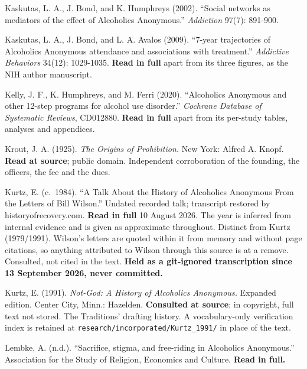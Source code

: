 \documentclass[11pt,a4paper]{article}
\begin{document}
\begin{list}{}{\setlength{\leftmargin}{1.5em}\setlength{\itemindent}{-1.5em}\setlength{\itemsep}{2pt}}
\item Kaskutas, L. A., J. Bond, and K. Humphreys (2002). ``Social networks as mediators of the effect of Alcoholics Anonymous.'' \textit{Addiction} 97(7): 891-900.

\item Kaskutas, L. A., J. Bond, and L. A. Avalos (2009). ``7-year trajectories of Alcoholics Anonymous attendance and associations with treatment.'' \textit{Addictive Behaviors} 34(12): 1029-1035. \textbf{Read in full} apart from its three figures, as the NIH author manuscript.

\item Kelly, J. F., K. Humphreys, and M. Ferri (2020). ``Alcoholics Anonymous and other 12-step programs for alcohol use disorder.'' \textit{Cochrane Database of Systematic Reviews}, CD012880. \textbf{Read in full} apart from its per-study tables, analyses and appendices.

\item Krout, J. A. (1925). \textit{The Origins of Prohibition.} New York: Alfred A. Knopf. \textbf{Read at source}; public domain. Independent corroboration of the founding, the officers, the fee and the dues.

\item Kurtz, E. (c.\ 1984). ``A Talk About the History of Alcoholics Anonymous From the Letters of Bill Wilson.'' Undated recorded talk; transcript restored by historyofrecovery.com. \textbf{Read in full} 10 August 2026. The year is inferred from internal evidence and is given as approximate throughout. Distinct from Kurtz (1979/1991). Wilson's letters are quoted within it from memory and without page citations, so anything attributed to Wilson through this source is at a remove. Consulted, not cited in the text. \textbf{Held as a git-ignored transcription since 13 September 2026, never committed.}

\item Kurtz, E. (1991). \textit{Not-God: A History of Alcoholics Anonymous.} Expanded edition. Center City, Minn.: Hazelden. \textbf{Consulted at source}; in copyright, full text not stored. The Traditions' drafting history. A vocabulary-only verification index is retained at \texttt{research/incorporated/Kurtz\_1991/} in place of the text.

\item Lembke, A. (n.d.). ``Sacrifice, stigma, and free-riding in Alcoholics Anonymous.'' Association for the Study of Religion, Economics and Culture. \textbf{Read in full.}


\end{list}
\end{document}

